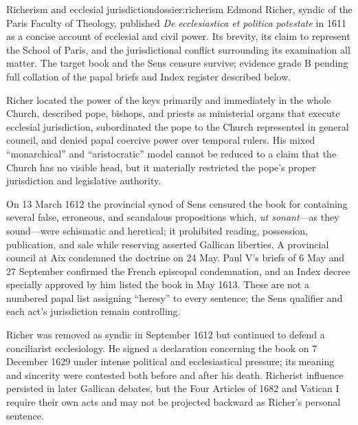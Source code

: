 \begin{heresydossier}{Richerism and ecclesial jurisdiction}{dossier:richerism}
\objectfield Edmond Richer, syndic of the Paris Faculty of Theology, published \emph{De ecclesiastica et politica potestate} in 1611 as a concise account of ecclesial and civil power. Its brevity, its claim to represent the School of Paris, and the jurisdictional conflict surrounding its examination all matter. The target book and the Sens censure survive; evidence grade B pending full collation of the papal briefs and Index register described below.

\propositionfield Richer located the power of the keys primarily and immediately in the whole Church, described pope, bishops, and priests as ministerial organs that execute ecclesial jurisdiction, subordinated the pope to the Church represented in general council, and denied papal coercive power over temporal rulers. His mixed ``monarchical'' and ``aristocratic'' model cannot be reduced to a claim that the Church has no visible head, but it materially restricted the pope's proper jurisdiction and legislative authority.

\responsefield On 13 March 1612 the provincial synod of Sens censured the book for containing several false, erroneous, and scandalous propositions which, \emph{ut sonant}---as they sound---were schismatic and heretical; it prohibited reading, possession, publication, and sale while reserving asserted Gallican liberties. A provincial council at Aix condemned the doctrine on 24 May. Paul V's briefs of 6 May and 27 September confirmed the French episcopal condemnation, and an Index decree specially approved by him listed the book in May 1613. These are not a numbered papal list assigning ``heresy'' to every sentence; the Sens qualifier and each act's jurisdiction remain controlling.

\aftermathfield Richer was removed as syndic in September 1612 but continued to defend a conciliarist ecclesiology. He signed a declaration concerning the book on 7 December 1629 under intense political and ecclesiastical pressure; its meaning and sincerity were contested both before and after his death. Richerist influence persisted in later Gallican debates, but the Four Articles of 1682 and Vatican I require their own acts and may not be projected backward as Richer's personal sentence.
\end{heresydossier}

